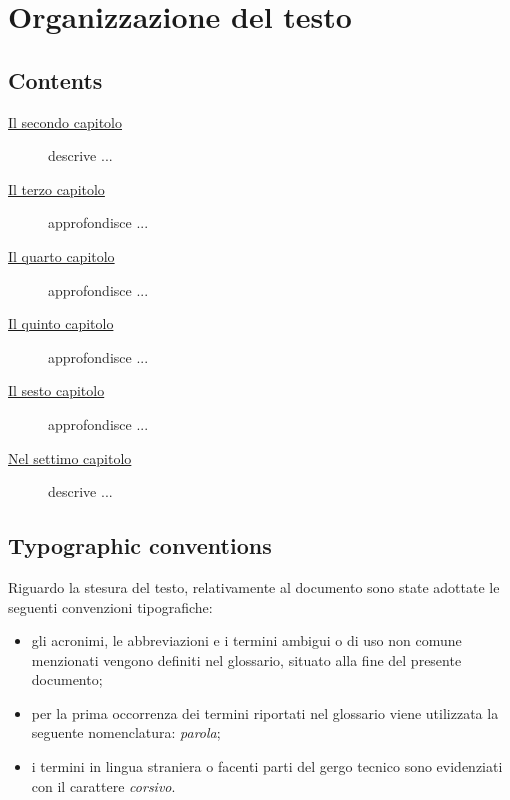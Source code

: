 


\section{Organizzazione del testo}

\subsection{Contents}

\begin{description}
    \item[{\hyperref[cap:processi-metodologie]{Il secondo capitolo}}] descrive ...
    
    \item[{\hyperref[cap:descrizione-stage]{Il terzo capitolo}}] approfondisce ...
    
    \item[{\hyperref[cap:analisi-requisiti]{Il quarto capitolo}}] approfondisce ...
    
    \item[{\hyperref[cap:progettazione-codifica]{Il quinto capitolo}}] approfondisce ...
    
    \item[{\hyperref[cap:verifica-validazione]{Il sesto capitolo}}] approfondisce ...
    
    \item[{\hyperref[cap:conclusioni]{Nel settimo capitolo}}] descrive ...
\end{description}

\subsection{Typographic conventions}
Riguardo la stesura del testo, relativamente al documento sono state adottate le seguenti convenzioni tipografiche:
\begin{itemize}
	\item gli acronimi, le abbreviazioni e i termini ambigui o di uso non comune menzionati vengono definiti nel glossario, situato alla fine del presente documento;
	\item per la prima occorrenza dei termini riportati nel glossario viene utilizzata la seguente nomenclatura: \emph{parola}\glsfirstoccur;
	\item i termini in lingua straniera o facenti parti del gergo tecnico sono evidenziati con il carattere \emph{corsivo}.
\end{itemize}